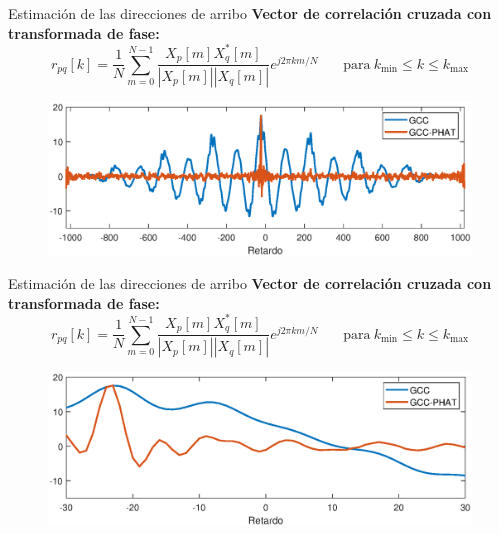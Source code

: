 \documentclass[12pt,aspectratio=169]{beamer}
\begin{document}
	\begin{frame}{Estimación de las direcciones de arribo}
	\textbf{Vector de correlación cruzada con transformada de fase:}
	\begin{equation}
	r_{pq}[k] = \frac{1}{N} \sum\limits_{m = 0}^{N-1} \frac{X_p[m]X_q^*[m]}{|X_p[m]| |X_q[m]|} e^{j2\pi km/N}~~~~~~~~\mathrm{para~}k_{\mathrm{min}}\le k\le k_{\mathrm{max}}
	\end{equation}
	\begin{figure}[h]
		\centering
		\includegraphics[width=\linewidth]{figures/GCCvsGCCphat}
	\end{figure}
	\end{frame}
	
	\begin{frame}{Estimación de las direcciones de arribo}
		\textbf{Vector de correlación cruzada con transformada de fase:}
		\begin{equation}
		r_{pq}[k] = \frac{1}{N} \sum\limits_{m = 0}^{N-1} \frac{X_p[m]X_q^*[m]}{|X_p[m]| |X_q[m]|} e^{j2\pi km/N}~~~~~~~~\mathrm{para~}k_{\mathrm{min}}\le k\le k_{\mathrm{max}}
		\end{equation}
		\begin{figure}[h]
			\centering
			\includegraphics[width=\linewidth]{figures/zoomGCCvsGCCphat}
		\end{figure}
	\end{frame}
\end{document}
